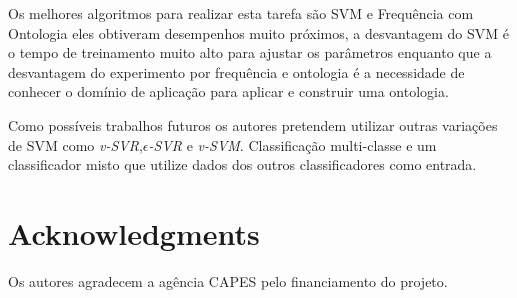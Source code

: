 \documentclass{sig-alternate-05-2015}
\begin{document}
Os melhores algoritmos para realizar esta tarefa são SVM e Frequência com Ontologia eles obtiveram desempenhos muito próximos, a desvantagem do SVM é o tempo de treinamento muito alto para ajustar os parâmetros enquanto que a desvantagem do experimento por frequência e ontologia é a necessidade de conhecer o domínio de aplicação para aplicar e construir uma ontologia.

Como possíveis trabalhos futuros os autores pretendem utilizar outras variações de SVM como \emph{v-SVR},\emph{\(\epsilon\)-SVR} e \emph{v-SVM}. Classificação multi-classe e um classificador misto que utilize dados dos outros classificadores como entrada.

\section{Acknowledgments}
Os autores agradecem a agência CAPES pelo financiamento do projeto.


 

\balancecolumns
\end{document}
